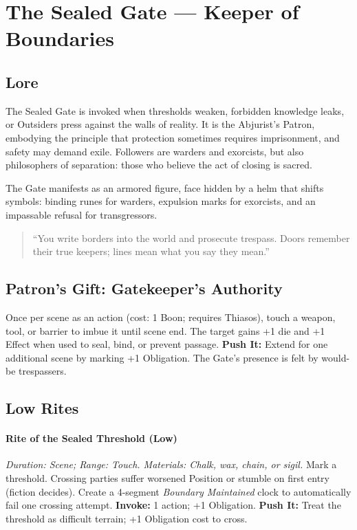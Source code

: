 \section{The Sealed Gate --- Keeper of Boundaries}
\label{patron:sealedgate}

\subsection*{Lore}
%
The Sealed Gate is invoked when thresholds weaken, forbidden knowledge leaks, or Outsiders press against the walls of reality. It is the Abjurist’s Patron, embodying the principle that protection sometimes requires imprisonment, and safety may demand exile. Followers are warders and exorcists, but also philosophers of separation: those who believe the act of closing is sacred.

The Gate manifests as an armored figure, face hidden by a helm that shifts symbols: binding runes for warders, expulsion marks for exorcists, and an impassable refusal for transgressors.  

\begin{quote}
``You write borders into the world and prosecute trespass. Doors remember their true keepers; lines mean what you say they mean.''
\end{quote}

\subsection*{Patron's Gift: Gatekeeper's Authority}
Once per scene as an action (cost: 1 Boon; requires Thiasos), touch a weapon, tool, or barrier to imbue it until scene end. The target gains +1 die and +1 Effect when used to seal, bind, or prevent passage.  
\textbf{Push It:} Extend for one additional scene by marking +1 Obligation. The Gate’s presence is felt by would-be trespassers.

\subsection*{Low Rites}
\paragraph{Rite of the Sealed Threshold (Low)}%
\emph{Duration: Scene; Range: Touch. Materials: Chalk, wax, chain, or sigil.}  
Mark a threshold. Crossing parties suffer worsened Position or stumble on first entry (fiction decides). Create a 4-segment \emph{Boundary Maintained} clock to automatically fail one crossing attempt.  
\textbf{Invoke:} 1 action; +1 Obligation.  
\textbf{Push It:} Treat the threshold as difficult terrain; +1 Obligation cost to cross.

